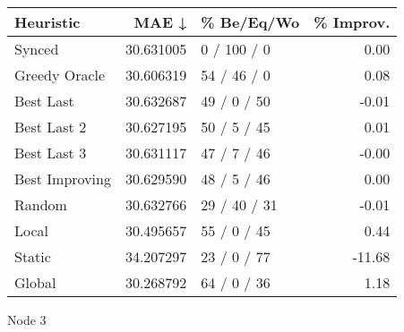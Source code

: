 \begin{tabular}{lrlr}
\toprule
      Heuristic &      MAE ↓ &    \% Be/Eq/Wo & \% Improv. \\
\midrule
         Synced &  30.631005 &   0 / 100 / 0 &      0.00 \\
  Greedy Oracle &  30.606319 &   54 / 46 / 0 &      0.08 \\
      Best Last &  30.632687 &   49 / 0 / 50 &     -0.01 \\
    Best Last 2 &  30.627195 &   50 / 5 / 45 &      0.01 \\
    Best Last 3 &  30.631117 &   47 / 7 / 46 &     -0.00 \\
 Best Improving &  30.629590 &   48 / 5 / 46 &      0.00 \\
         Random &  30.632766 &  29 / 40 / 31 &     -0.01 \\
          Local &  30.495657 &   55 / 0 / 45 &      0.44 \\
         Static &  34.207297 &   23 / 0 / 77 &    -11.68 \\
         Global &  30.268792 &   64 / 0 / 36 &      1.18 \\
\bottomrule
\end{tabular}
\caption{Node 3}
\label{tab:non_lr001_le1_bs2_3}
